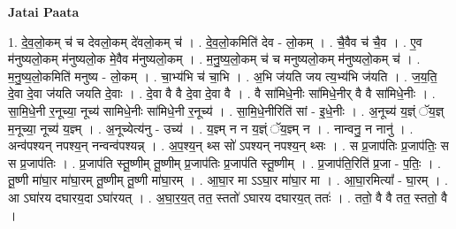 \documentclass[17pt]{extarticle}
\begin{document}
\textbf{Jatai Paata} \newline

1. दे॒व॒लो॒कम् च॑ च देवलो॒कम् दे॑वलो॒कम् च॑ । . दे॒व॒लो॒कमिति॑ देव - लो॒कम् । . चै॒वैव च॑ चै॒व । . ए॒व म॑नुष्यलो॒कम् म॑नुष्यलो॒क मे॒वैव म॑नुष्यलो॒कम् । . म॒नु॒ष्य॒लो॒कम् च॑ च मनुष्यलो॒कम् म॑नुष्यलो॒कम् च॑ । . म॒नु॒ष्य॒लो॒कमिति॑ मनुष्य - लो॒कम् । . चा॒भ्य॑भि च॑ चा॒भि । . अ॒भि ज॑यति जय त्य॒भ्य॑भि ज॑यति । . ज॒य॒ति॒ दे॒वा दे॒वा ज॑यति जयति दे॒वाः । . दे॒वा वै वै दे॒वा दे॒वा वै । . वै सा॑मिधे॒नीः सा॑मिधे॒नीर् वै वै सा॑मिधे॒नीः । . सा॒मि॒धे॒नी र॒नूच्या॒ नूच्य॑ सामिधे॒नीः सा॑मिधे॒नी र॒नूच्य॑ । . सा॒मि॒धे॒नीरिति॑ सां - इ॒धे॒नीः । . अ॒नूच्य॑ य॒ज्ञ्ं ॅय॒ज्ञ् म॒नूच्या॒ नूच्य॑ य॒ज्ञ्म् । . अ॒नूच्येत्य॑नु - उच्य॑ । . य॒ज्ञ्म् न न य॒ज्ञ्ं ॅय॒ज्ञ्म् न । . नान्वनु॒ न नानु॑ । . अन्व॑पश्यन् नपश्य॒न् नन्वन्व॑पश्यन्न् । . अ॒प॒श्य॒न् थ्स सो॑ ऽपश्यन् नपश्य॒न् थ्सः । . स प्र॒जाप॑तिः प्र॒जाप॑तिः॒ स स प्र॒जाप॑तिः । . प्र॒जाप॑ति स्तू॒ष्णीम् तू॒ष्णीम् प्र॒जाप॑तिः प्र॒जाप॑ति स्तू॒ष्णीम् । . प्र॒जाप॑ति॒रिति॑ प्र॒जा - प॒तिः॒ । . तू॒ष्णी मा॑घा॒र मा॑घा॒रम् तू॒ष्णीम् तू॒ष्णी मा॑घा॒रम् । . आ॒घा॒र मा ऽऽघा॒र मा॑घा॒र मा । . आ॒घा॒रमित्या᳚ - घा॒रम् । . आ ऽघा॑रय दघारय॒दा ऽघा॑रयत् । . अ॒घा॒र॒य॒त् तत॒ स्ततो॑ ऽघारय दघारय॒त् ततः॑ । . ततो॒ वै वै तत॒ स्ततो॒ वै । \newline
\end{document}
